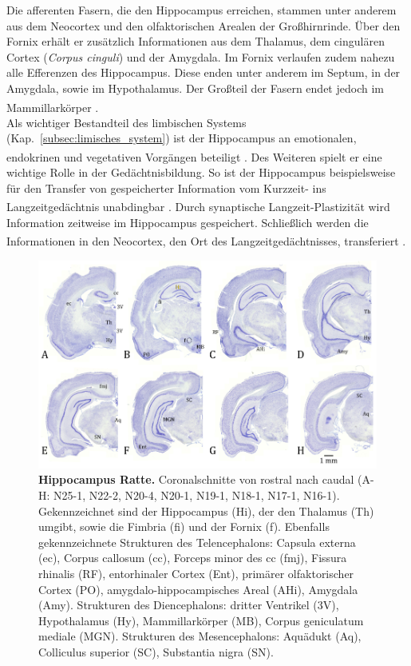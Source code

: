 \noindent Die afferenten Fasern, die den Hippocampus erreichen, stammen unter anderem aus dem Neocortex und den olfaktorischen Arealen der Großhirnrinde. Über den Fornix erhält er zusätzlich Informationen aus dem Thalamus, dem cingulären Cortex (\textit{Corpus cinguli}) und der Amygdala. Im Fornix verlaufen zudem nahezu alle Efferenzen des Hippocampus. Diese enden unter anderem im Septum, in der Amygdala, sowie im Hypothalamus. Der Großteil der Fasern endet jedoch im Mammillarkörper \textsuperscript{\cite[Kap.~9]{trepel2011neuroanatomie}}.\\

\noindent Als wichtiger Bestandteil des limbischen Systems (Kap.~\ref{subsec:limisches_system}) ist der Hippocampus an emotionalen, endokrinen und vegetativen Vorgängen beteiligt \textsuperscript{\cite[Kap.~9]{trepel2011neuroanatomie}}. Des Weiteren spielt er eine wichtige Rolle in der Gedächtnisbildung. So ist der Hippocampus beispielsweise für den Transfer von gespeicherter Information vom Kurzzeit- ins Langzeitgedächtnis unabdingbar \textsuperscript{\cite[Kap.~6]{storch2012lehrbuchzoo}}. Durch synaptische Langzeit-Plastizität wird Information zeitweise im Hippocampus gespeichert. Schließlich werden die Informationen in den Neocortex, den Ort des Langzeitgedächtnisses, transferiert \textsuperscript{\cite[Kap.~18]{kandel2013principles}}.

\begin{figure}[H]
    \centering
    \includegraphics[width=\textwidth]{pictures/Bilder_Jule/Ratte/hippocampus.png}
    \caption[Hippocampus Ratte]{\textbf{Hippocampus Ratte.} Coronalschnitte von rostral nach caudal (A-H: N25-1, N22-2, N20-4, N20-1, N19-1, N18-1, N17-1, N16-1). Gekennzeichnet sind der Hippocampus (Hi), der den Thalamus (Th) umgibt, sowie die Fimbria (fi) und der Fornix (f). Ebenfalls gekennzeichnete Strukturen des Telencephalons: Capsula externa (ec), Corpus callosum (cc), Forceps minor des cc (fmj), Fissura rhinalis (RF), entorhinaler Cortex  (Ent), primärer olfaktorischer Cortex (PO), amygdalo-hippocampisches Areal (AHi), Amygdala (Amy). Strukturen des Diencephalons: dritter Ventrikel (3V), Hypothalamus (Hy), Mammillarkörper (MB), Corpus geniculatum mediale (MGN). Strukturen des Mesencephalons: Aquädukt (Aq), Colliculus superior (SC), Substantia nigra (SN).}
    \label{fig:hippocampus_ratte}
\end{figure}{}

